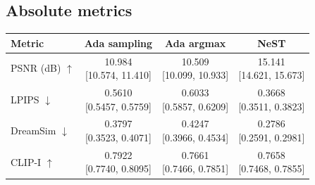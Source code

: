 \documentclass[11pt,letterpaper]{article}
\begin{document}
\subsection*{Absolute metrics}
\begin{center}\small\setlength{\tabcolsep}{7pt}\renewcommand{\arraystretch}{1.55}
\begin{tabular}{lccc}
\toprule
Metric & Ada sampling & Ada argmax & NeST\\\midrule
PSNR (dB) $\uparrow$ & \shortstack{10.984\\{}[10.574, 11.410]} & \shortstack{10.509\\{}[10.099, 10.933]} & \shortstack{15.141\\{}[14.621, 15.673]}\\
LPIPS $\downarrow$ & \shortstack{0.5610\\{}[0.5457, 0.5759]} & \shortstack{0.6033\\{}[0.5857, 0.6209]} & \shortstack{0.3668\\{}[0.3511, 0.3823]}\\
DreamSim $\downarrow$ & \shortstack{0.3797\\{}[0.3523, 0.4071]} & \shortstack{0.4247\\{}[0.3966, 0.4534]} & \shortstack{0.2786\\{}[0.2591, 0.2981]}\\
CLIP-I $\uparrow$ & \shortstack{0.7922\\{}[0.7740, 0.8095]} & \shortstack{0.7661\\{}[0.7466, 0.7851]} & \shortstack{0.7658\\{}[0.7468, 0.7855]}\\
\bottomrule\end{tabular}\end{center}
\end{document}
